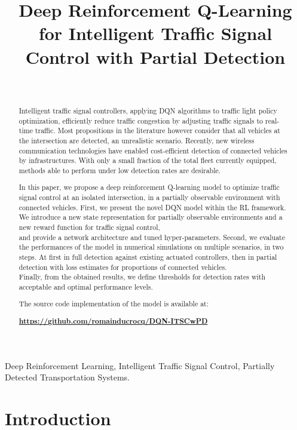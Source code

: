 \documentclass[journal]{IEEEtran}
\title{Deep Reinforcement Q-Learning for Intelligent Traffic Signal Control with Partial Detection}
\author{
\IEEEauthorblockN{Romain Ducrocq, Nadir Farhi} \\
\IEEEauthorblockA{COSYS-GRETTIA, Univ Gustave Eiffel, IFSTTAR, F-77454 Marne-la-Vallée, France}
}
\begin{document}
\maketitle
\begin{abstract}
Intelligent traffic signal controllers, applying DQN algorithms to traffic light policy optimization, efficiently reduce traffic congestion by adjusting traffic signals to real-time traffic.
Most propositions in the literature however consider that all vehicles at the intersection are detected, an unrealistic scenario. 
Recently, new wireless communication technologies have enabled cost-efficient detection of connected vehicles by infrastructures.
With only a small fraction of the total fleet currently equipped, methods able to perform under low detection rates are desirable.

In this paper, we propose a deep reinforcement Q-learning model to optimize traffic signal control at an isolated intersection, in a partially observable environment with connected vehicles. 
First, we present the novel DQN model within the RL framework. We introduce a new state representation for partially observable environments and a new reward function for traffic signal control, \\ and provide a network architecture and tuned hyper-parameters.
Second, we evaluate the performances of the model in numerical simulations on multiple scenarios, in two steps. At first in full detection against existing actuated controllers, then in partial detection with loss estimates for proportions of connected vehicles. \\
Finally, from the obtained results, we define thresholds for detection rates with acceptable and optimal performance levels. 

The source code implementation of the model is available at:

\textcolor{blue}{\textbf{\url{https://github.com/romainducrocq/DQN-ITSCwPD}}}
\end{abstract}

\begin{IEEEkeywords}
Deep Reinforcement Learning, Intelligent Traffic Signal Control, Partially Detected Transportation Systems.
\end{IEEEkeywords}

\section{Introduction}
\label{sec:intro}
\end{document}

